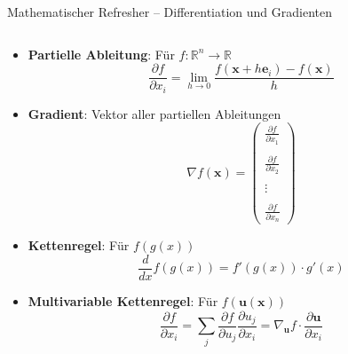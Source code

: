 \documentclass[aspectratio=1610, xcolor=dvipsnames, 9pt]{beamer}
\begin{document}
\begin{frame}{Mathematischer Refresher -- Differentiation und Gradienten}
  \begin{columns}
    \begin{column}{1\textwidth}
      \begin{itemize}
        \item \textbf{Partielle Ableitung}: Für $f: \mathbb{R}^n \to \mathbb{R}$
        \begin{equation}
          \frac{\partial f}{\partial x_i} = \lim_{h \to 0} \frac{f(\mathbf{x} + h\mathbf{e}_i) - f(\mathbf{x})}{h}
        \end{equation}
        \item \textbf{Gradient}: Vektor aller partiellen Ableitungen
        \begin{equation}
          \nabla f(\mathbf{x}) = \begin{pmatrix}
            \frac{\partial f}{\partial x_1} \\\\
            \frac{\partial f}{\partial x_2} \\\\
            \vdots \\\\
            \frac{\partial f}{\partial x_n}
          \end{pmatrix}
        \end{equation}
        \item \textbf{Kettenregel}: Für $f(g(x))$
        \begin{equation}
          \frac{d}{dx} f(g(x)) = f'(g(x)) \cdot g'(x)
        \end{equation}
        \item \textbf{Multivariable Kettenregel}: Für $f(\mathbf{u}(\mathbf{x}))$
        \begin{equation}
          \frac{\partial f}{\partial x_i} = \sum_j \frac{\partial f}{\partial u_j} \frac{\partial u_j}{\partial x_i} = \nabla_\mathbf{u} f \cdot \frac{\partial \mathbf{u}}{\partial x_i}
        \end{equation}
      \end{itemize}
    \end{column}
  \end{columns}
\end{frame}
\end{document}
